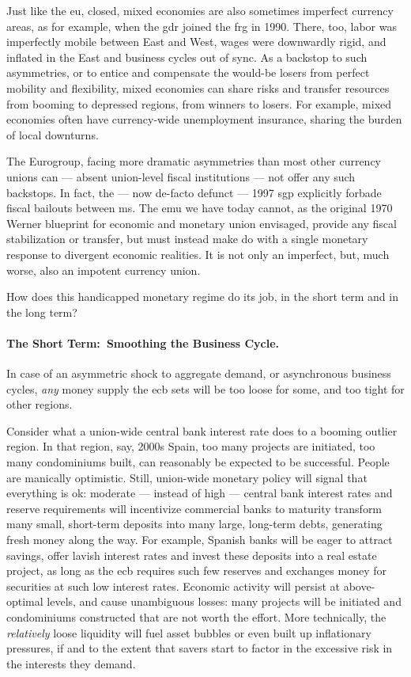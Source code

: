 Just like the \gls{eu}, closed, mixed economies are also sometimes imperfect currency areas, as for example, when the \gls{gdr} joined the \gls{frg} in 1990.
There, too, labor was imperfectly mobile between East and West, wages were downwardly rigid, and inflated in the East and business cycles out of sync.
As a backstop to such asymmetries, or to entice and compensate the would-be losers from perfect mobility and flexibility, mixed economies can share risks and transfer resources from booming to depressed regions, from winners to losers.
For example, mixed economies often have currency-wide unemployment insurance, sharing the burden of local downturns.

The Eurogroup, facing more dramatic asymmetries than most other currency unions can --- absent union-level fiscal institutions --- not offer any such backstops.
In fact, the --- now de-facto defunct --- 1997 \gls{sgp} explicitly forbade fiscal bailouts between \gls{ms}.
The \gls{emu} we have today cannot, as the original 1970 Werner blueprint for economic and monetary union envisaged, provide any fiscal stabilization or transfer, but must instead make do with a single monetary response to divergent economic realities.
It is not only an imperfect, but, much worse, also an impotent currency union.

How does this handicapped monetary regime do its job, in the short term and in the long term?

\paragraph[Short Term]{The Short Term:~Smoothing the Business Cycle.}
In case of an asymmetric shock to aggregate demand, or asynchronous business cycles, \emph{any} money supply the \gls{ecb} sets will be too loose for some, and too tight for other regions.

Consider what a union-wide central bank interest rate does to a booming outlier region.
In that region, say, 2000s Spain, too many projects are initiated, too many condominiums built, can reasonably be expected to be successful.
People are manically optimistic.
Still, union-wide monetary policy will signal that everything is ok:
moderate --- instead of high --- central bank interest rates and reserve requirements will incentivize commercial banks to maturity transform many small, short-term deposits into many large, long-term debts, generating fresh money along the way.
For example, Spanish banks will be eager to attract savings, offer lavish interest rates and invest these deposits into a real estate project, as long as the \gls{ecb} requires such few reserves and exchanges money for securities at such low interest rates.
Economic activity will persist at above-optimal levels, and cause unambiguous losses:
many projects will be initiated and condominiums constructed that are not worth the effort.
More technically, the \emph{relatively} loose liquidity will fuel asset bubbles or even built up inflationary pressures, if and to the extent that savers start to factor in the excessive risk in the interests they demand.

